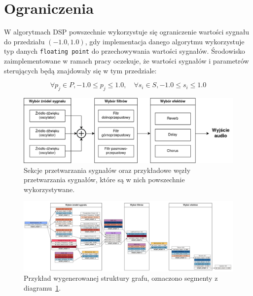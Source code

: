 \section{Ograniczenia}

W algorytmach DSP powszechnie wykorzystuje się ograniczenie wartości
sygnału do przedziału $(-1.0, 1.0)$, gdy implementacja danego algorytmu wykorzystuje 
typ danych \texttt{floating point} do przechowywania wartości sygnałów. Środowisko zaimplementowane
w ramach pracy oczekuje, że wartości sygnałów i parametrów sterujących
będą znajdowały się w tym przedziale:

\begin{equation}
  \forall p_j \in P,  -1.0 \leq p_j \leq 1.0, \quad \forall s_i \in S, -1.0 \leq s_i \leq 1.0
  \label{eq:parameter_bounds}
\end{equation}

\begin{figure}[H]
    \centering
    \includegraphics[width=0.8\linewidth]{rys06/synth_architecture.png}
    \caption{
      Sekcje przetwarzania sygnałów oraz przykładowe węzły przetwarzania
      sygnałów, które są w nich powszechnie wykorzystywane.
    }\label{fig:synth_architecture_diagram}
\end{figure}

\begin{figure}
    \centering
    \includegraphics[angle=90, width=0.5\linewidth]{rys06/example_generated_graph.png}
    \caption{
      Przykład wygenerowanej struktury grafu, oznaczono segmenty z diagramu~\ref{fig:synth_architecture_diagram}.
    }\label{fig:example_generated_graph}
\end{figure}



